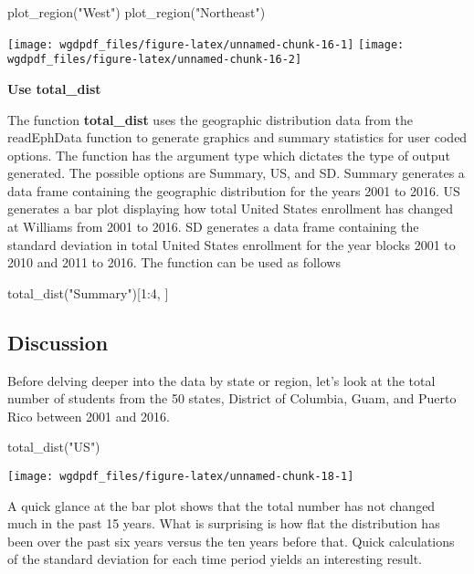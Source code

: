 \begin{Schunk}
\begin{Sinput}
plot_region("West")
plot_region("Northeast")
\end{Sinput}

\texttt{[image: wgdpdf\_files/figure-latex/unnamed-chunk-16-1]} \texttt{[image: wgdpdf\_files/figure-latex/unnamed-chunk-16-2]} \end{Schunk}

\textbf{Use total\_dist}

The function \textbf{total\_dist} uses the geographic distribution data
from the readEphData function to generate graphics and summary
statistics for user coded options. The function has the argument type
which dictates the type of output generated. The possible options are
Summary, US, and SD. Summary generates a data frame containing the
geographic distribution for the years 2001 to 2016. US generates a bar
plot displaying how total United States enrollment has changed at
Williams from 2001 to 2016. SD generates a data frame containing the
standard deviation in total United States enrollment for the year blocks
2001 to 2010 and 2011 to 2016. The function can be used as follows

\begin{Schunk}
\begin{Sinput}
total_dist("Summary")[1:4, ]
\end{Sinput}
\end{Schunk}

\subsection{Discussion}\label{discussion}

Before delving deeper into the data by state or region, let's look at
the total number of students from the 50 states, District of Columbia,
Guam, and Puerto Rico between 2001 and 2016.

\begin{Schunk}
\begin{Sinput}
total_dist("US")
\end{Sinput}

\texttt{[image: wgdpdf\_files/figure-latex/unnamed-chunk-18-1]} \end{Schunk}

A quick glance at the bar plot shows that the total number has not
changed much in the past 15 years. What is surprising is how flat the
distribution has been over the past six years versus the ten years
before that. Quick calculations of the standard deviation for each time
period yields an interesting result.

